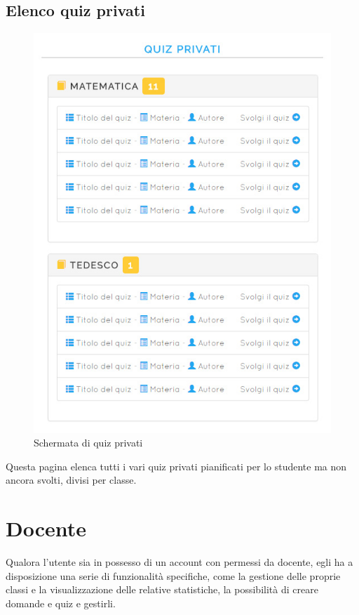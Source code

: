 \documentclass[a4paper, titlepage]{article}
\begin{document}
	 \subsection{Elenco quiz privati}
	 \begin{figure}[!h]
	 	\centering
	 	\includegraphics[scale=0.33]{Img/screen_ListaQuizPrivati.png}
	 	\caption{Schermata di quiz privati}
	 \end{figure}
	 Questa pagina elenca tutti i vari quiz privati pianificati per lo studente ma non ancora svolti, divisi per classe.
	 
	 
	 \newpage
	 \section{Docente}
	 Qualora l'utente sia in possesso di un account con permessi da docente, egli ha a disposizione una serie di funzionalità specifiche, come la gestione delle proprie classi e la visualizzazione delle relative statistiche, la possibilità di creare domande e quiz e gestirli.
	 
\end{document}
